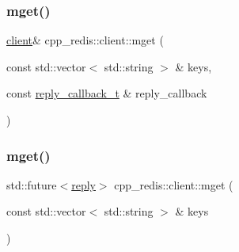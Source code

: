 \mbox{\label{classcpp__redis_1_1client_a946b590d9a2a29ee6ae1971b9208a241}} 
\subsubsection{\texorpdfstring{mget()}{mget()}\hspace{0.1cm}{\footnotesize\ttfamily [1/2]}}
{\footnotesize\ttfamily \hyperlink{classcpp__redis_1_1client}{client}\& cpp\+\_\+redis\+::client\+::mget (\begin{DoxyParamCaption}\item[{const std\+::vector$<$ std\+::string $>$ \&}]{keys,  }\item[{const \hyperlink{classcpp__redis_1_1client_a061a1140d36d2eaeda82b09a0bb3f9f2}{reply\+\_\+callback\+\_\+t} \&}]{reply\+\_\+callback }\end{DoxyParamCaption})}

\mbox{\label{classcpp__redis_1_1client_a8c08062c8414fd72d1a0b3ef4f44d89d}} 
\subsubsection{\texorpdfstring{mget()}{mget()}\hspace{0.1cm}{\footnotesize\ttfamily [2/2]}}
{\footnotesize\ttfamily std\+::future$<$\hyperlink{classcpp__redis_1_1reply}{reply}$>$ cpp\+\_\+redis\+::client\+::mget (\begin{DoxyParamCaption}\item[{const std\+::vector$<$ std\+::string $>$ \&}]{keys }\end{DoxyParamCaption})}

\mbox{\label{classcpp__redis_1_1client_acfbf3cb40c0cd532e42d725bbda9a03a}} 
